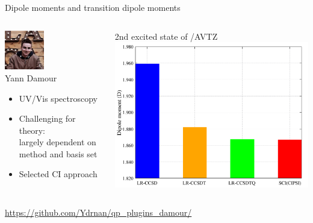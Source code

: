 \documentclass[aspectratio=169,9pt]{beamer}
\begin{document}
\begin{frame}{Dipole moments and transition dipole moments}

\begin{columns}
\begin{column}{0.5\textwidth}

\centering
\includegraphics[width=0.4\textwidth]{fig/Yann2.jpg}
\\
Yann Damour
\\
\begin{itemize}

	\item UV/Vis spectroscopy
                        \bigskip
	\item Challenging for theory: \\ largely dependent on method and basis set 
                        \bigskip
	\item Selected CI approach 
\end{itemize}
\end{column}

                \begin{column}{0.5\textwidth}
                        \centering
                        \begin{block}{2nd excited state of /AVTZ}
			\includegraphics[width=1.0\textwidth]{fig/h2s_avtz.pdf}
                        \end{block}
                \end{column}

        \end{columns}

                        \bigskip
                        \centering
        \url{https://github.com/Ydrnan/qp_plugins_damour/}

\end{frame}
\end{document}
